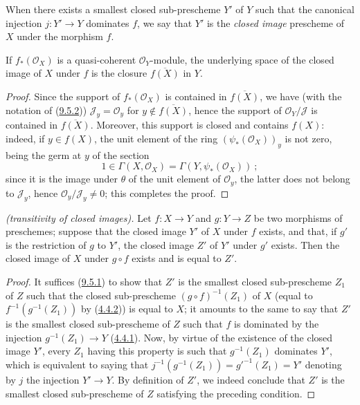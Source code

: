 \begin{definition}[9.5.3]
\label{I.9.5.3}
When there exists a smallest closed sub-prescheme $Y'$ of $Y$ such that
the canonical injection $j:Y'\to Y$ dominates $f$, we say that $Y'$ is the
\emph{closed image} prescheme of $X$ under the morphism $f$.
\end{definition}

\begin{proposition}[9.5.4]
\label{I.9.5.4}
If $f_*(\mathscr{O}_X)$ is a quasi-coherent $\mathscr{O}_Y$-module, the
underlying space of the closed image of $X$ under $f$ is the closure
$\overline{f(X)}$ in $Y$.
\end{proposition}

\begin{proof}
Since the support of $f_*(\mathscr{O}_X)$ is contained in
$\overline{f(X)}$, we have (with the notation of
(\hyperref[I.9.5.2]{9.5.2})) $\mathscr{J}_y=\mathscr{O}_y$ for
$y\notin\overline{f(X)}$, hence the support of
$\mathscr{O}_Y/\mathscr{J}$ is contained in $\overline{f(X)}$. Moreover,
this support is closed and contains $f(X)$: indeed, if $y\in f(X)$, the
unit element of the ring $(\psi_*(\mathscr{O}_X))_y$ is not zero, being the
germ at $y$ of the section
\[
  1\in\Gamma(X,\mathscr{O}_X)=\Gamma(Y,\psi_*(\mathscr{O}_X))~;
\]
since it is the image under $\theta$ of the unit element of $\mathscr{O}_y$,
the latter does not belong to $\mathscr{J}_y$, hence
$\mathscr{O}_y/\mathscr{J}_y\neq0$; this completes the proof.
\end{proof}

\begin{proposition}[9.5.5]
\label{I.9.5.5}
\emph{(transitivity of closed images).} Let $f:X\to Y$ and $g:Y\to Z$
be two morphisms of preschemes; suppose that the closed image $Y'$ of $X$
under $f$ exists, and that, if $g'$ is the restriction of $g$ to $Y'$, the
closed image $Z'$ of $Y'$ under $g'$ exists. Then the closed image of $X$
under $g\circ f$ exists and is equal to $Z'$.
\end{proposition}

\begin{proof}
It suffices (\hyperref[I.9.5.1]{9.5.1}) to show that $Z'$ is the
smallest closed sub-prescheme $Z_1$ of $Z$ such that the closed sub-prescheme
$(g\circ f)^{-1}(Z_1)$ of $X$ (equal to $f^{-1}(g^{-1}(Z_1))$ by
(\hyperref[I.4.4.2]{4.4.2})) is equal to $X$; it amounts to the same to
say that $Z'$ is the smallest closed sub-prescheme of $Z$ such that $f$ is
dominated by the injection $g^{-1}(Z_1)\to Y$
(\hyperref[I.4.4.1]{4.4.1}). Now, by virtue of the existence of the
closed image $Y'$, every $Z_1$ having this property is such that
$g^{-1}(Z_1)$ dominates $Y'$, which is equivalent to saying that
$j^{-1}(g^{-1}(Z_1))=g'^{-1}(Z_1)=Y'$ denoting by $j$ the injection
$Y'\to Y$. By definition of $Z'$, we indeed conclude that $Z'$ is the
smallest closed sub-prescheme of $Z$ satisfying the preceding condition.
\end{proof}

